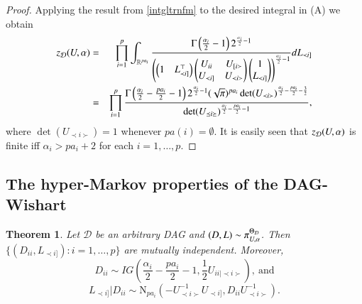 \documentclass[12pt]{article}
\newcommand{\R}{\mathbb{R}}
\newcommand{\D}{\mathcal{D}}
\theoremstyle{plain}
\newtheorem{theorem}{Theorem}[section]
\theoremstyle{definition}
\theoremstyle{remark}
\begin{document}
\begin{proof}
\noindent
Applying the result from  \eqref{intgltrnfm} to the desired integral in (A) we obtain
\begin{eqnarray*}
z_{\D} (U, {\bf \alpha}) &=&\prod_{i=1}^{p} \int_{\R^{pa_i}} \frac{\Gamma \left( \frac{\alpha_i}{2} - 1 \right)
2^{\frac{\alpha_i}{2}-1}}{\left(\left(\begin{matrix}1& L^{\top}_{\prec i]}\end{matrix}\right)\left(\begin{matrix}U_{ii}& U_{[i\succ}\\U_{\prec i]}& U_{\prec i\succ}\end{matrix}\right) \left(\begin{matrix} 1\\ L_{\prec i]} \end{matrix}\right)
\right)^{\frac{\alpha_i}{2} - 1}} dL_{\prec i]}\\
&=& \prod_{i=1}^{p} \frac{\Gamma \left( \frac{\alpha_i}{2} -
\frac{pa_i}{2} - 1 \right) 2^{\frac{\alpha_i}{2} - 1}
(\sqrt{\pi})^{pa_i} \det(U_{\prec i\succ})^{\frac{\alpha_i}{2} -
\frac{pa_i}{2} - \frac{3}{2}}}{\det(U_{\preceq i\succeq})^{\frac{\alpha_i}{2} -
\frac{pa_i}{2} - 1}},
\end{eqnarray*}
\noindent
where $\det(U_{\prec i \succ}) = 1$ whenever $pa(i) = \emptyset$. It is easily seen that $z_{\D} (U, {\bf \alpha})$ is finite  iff  $\alpha_i> pa_i+2 $  for each  $i=1,\ldots,p.$
\end{proof}

\subsection*{The hyper-Markov properties of the DAG-Wishart}\label{sub:hydag}
\begin{theorem}\label{hydag}
Let $\D$ be an arbitrary DAG and $(D,L) \sim \pi^{\Theta_{\D}}_{U, {\bf \alpha}}$. Then $\{(D_{ii}, L_{\prec i]}): i=1,\ldots, p\}$ are mutually independent. Moreover,
\begin{equation}\label{dii}
D_{ii}\sim IG(\frac{\alpha_i}{2}-\frac{pa_i}{2}-1,  \frac{1}{2}U_{ii|\prec i\succ}) ,~\text{and}
\end{equation}
\begin{equation}\label{ind}
L_{\prec i]}|D_{ii}\sim \mathrm{N}_{pa_i}(-U^{-1}_{\prec i\succ}U_{\prec i]}, D_{ii}U^{-1}_{\prec i\succ} ).
\end{equation}
\end{theorem}
\end{document}
